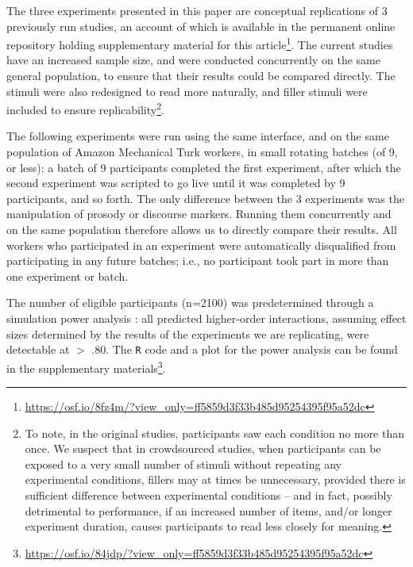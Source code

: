 The three experiments presented in this paper are conceptual
replications of 3 previously run studies, an account of which is
available in the permanent online repository holding supplementary
material for this article\footnote{\url{https://osf.io/8fz4m/?view_only=ff5859d3f33b485d95254395f95a52dc}}.
The current studies have an increased sample size, and were conducted
concurrently on the same general population, to ensure that their
results could be compared directly. The stimuli were also redesigned to
read more naturally, and filler stimuli were included to ensure
replicability\footnote{To note, in the original studies, participants
  saw each condition no more than once. We suspect that in crowdsourced
  studies, when participants can be exposed to a very small number of
  stimuli without repeating any experimental conditions, fillers may at
  times be unnecessary, provided there is sufficient difference between
  experimental conditions -- and in fact, possibly detrimental to
  performance, if an increased number of items, and/or longer experiment
  duration, causes participants to read less closely for meaning.}.

The following experiments were run using the same interface, and on the
same population of Amazon Mechanical Turk workers, in small rotating
batches (of 9, or less): a batch of 9 participants completed the first
experiment, after which the second experiment was scripted to go live
until it was completed by 9 participants, and so forth. The only
difference between the 3 experiments was the manipulation of prosody or
discourse markers. Running them concurrently and on the same population
therefore allows us to directly compare their results. All workers who
participated in an experiment were automatically disqualified from
participating in any future batches; i.e., no participant took part in
more than one experiment or batch.

The number of eligible participants (n=2100) was predetermined through a
simulation power analysis \citep[adapted from][]{Arnold2011}: all predicted higher-order interactions, assuming effect
sizes determined by the results of the experiments we are replicating,
were detectable at \(>\) .80. The \texttt{R} code and a plot for the
power analysis can be found in the supplementary materials\footnote{\url{https://osf.io/84jdp/?view_only=ff5859d3f33b485d95254395f95a52dc}}.